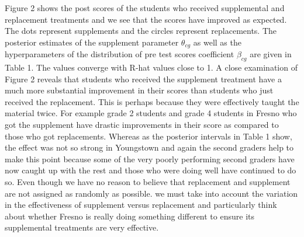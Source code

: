 \documentclass{article}
\begin{document}
Figure 2 shows the post scores of the students who received supplemental and replacement treatments and we see that the scores have improved as expected. The dots represent supplements and the circles represent replacements. The posterior estimates of the supplement parameter $\theta_{cg}$ as well as the hyperparameters of the distribution of pre test scores coefficient $\beta_{cg}$ are given in Table 1. The values converge with R-hat values close to 1. A close examination of Figure 2 reveals that students who received the supplement treatment have a much more substantial improvement in their scores than students who just received the replacement. This is perhaps because they were effectively taught the material twice. For example grade 2 students and grade 4 students in Fresno who got the supplement have drastic improvements in their score as compared to those who got replacements. Whereas as the posterior intervals in Table 1 show, the effect was not so strong in Youngstown and again the second graders help to make this point because some of the very poorly performing second graders have now caught up with the rest and those who were doing well have continued to do so. Even though we have no reason to believe that replacement and supplement are not assigned as randomly as possible. we must take into account the variation in the effectiveness of supplement versus replacement and particularly think about whether Fresno is really doing something different to ensure its supplemental treatments are very effective.
\end{document}
